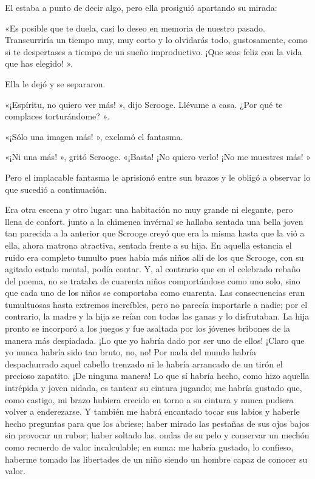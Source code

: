 \documentclass{novela}
\begin{document}
 El estaba a punto de decir algo, pero ella prosiguió apartando su mirada:

 «Es posible que te duela, casi lo deseo en memoria de nuestro pasado. Transcurriría un tiempo muy, muy corto y lo olvidarás todo, gustosamente, como si te despertases a tiempo de un sueño improductivo. ¡Que seas feliz con la vida que has elegido! ».

 Ella le dejó y se separaron.

 «¡Espíritu, no quiero ver más! », dijo Scrooge. Llévame a casa. ¿Por qué te complaces torturándome? ».

 «¡Sólo una imagen más! », exclamó el fantasma.

 «¡Ni una más! », gritó Scrooge. «¡Basta! ¡No quiero verlo! ¡No me muestres más! »

 Pero el implacable fantasma le aprisionó entre sun brazos y le obligó a observar lo que sucedió a continuación.

 Era otra escena y otro lugar: una habitación no muy grande ni elegante, pero llena de confort. junto a la chimenea invérnal se hallaba sentada una bella joven tan parecida a la anterior que Scrooge creyó que era la misma hasta que la vió a ella, ahora matrona atractiva, sentada frente a su hija. En aquella estancia el ruido era completo tumulto pues había más niños allí de los que Scrooge, con su agitado estado mental, podía contar. Y, al contrario que en el celebrado rebaño del poema, no se trataba de cuarenta niños comportándose como uno solo, sino que cada uno de los niños se comportaba como cuarenta. Las consecuencias eran tumultuosas hasta extremos increíbles, pero no parecía importarle a nadie; por el contrario, la madre y la hija se reían con todas las ganas y lo disfrutaban. La hija pronto se incorporó a los juegos y fue asaltada por los jóvenes bribones de la manera más despiadada. ¡Lo que yo habría dado por ser uno de ellos! ¡Claro que yo nunca habría sido tan bruto, no, no! Por nada del mundo habría despachurrado aquel cabello trenzado ni le habría arrancado de un tirón el precioso zapatito. ¡De ninguna manera! Lo que sí habría hecho, como hizo aquella intrépida y joven nidada, es tantear su cintura jugando; me habría gustado que, como castigo, mi brazo hubiera crecido en torno a su cintura y nunca pudiera volver a enderezarse. Y también me habrá encantado tocar sus labios y haberle hecho preguntas para que los abriese; haber mirado las pestañas de sus ojos bajos sin provocar un rubor; haber soltado las. ondas de su pelo y conservar un mechón como recuerdo de valor incalculable; en suma: me habría gustado, lo confieso, haberme tomado las libertades de un niño siendo un hombre capaz de conocer su valor.
\end{document}
